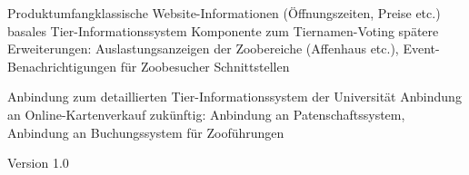 %
{Produktumfang}{klassische Website-Informationen (Öffnungszeiten, Preise etc.) \newline 
	basales Tier-Informationssystem \newline 
	Komponente zum Tiernamen-Voting \newline 
	spätere Erweiterungen: Auslastungsanzeigen der Zoo\-bereiche (Affenhaus etc.), Event-Benachrichtigungen für Zoo\-besucher
}%
{Schnittstellen}{Anbindung zum detaillierten Tier-Informationssystem der Universität \newline 
	Anbindung an Online-Kartenverkauf \newline 
	zukünftig: Anbindung an Patenschaftssystem, Anbindung an Buchungssystem für Zooführungen
\begin{flushright}
	\textnormal{\textsf{\footnotesize{Version 1.0}}}
\end{flushright}
}
{}{}%
{}%